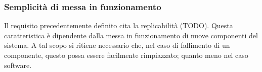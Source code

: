 \subsubsection{Semplicità di messa in funzionamento}
Il requisito precedentemente definito cita la replicabilità (TODO). Questa caratteristica è dipendente dalla messa in funzionamento di nuove componenti del sistema. A tal scopo si ritiene necessario che, nel caso di fallimento di un componente, questo possa essere facilmente rimpiazzato; quanto meno nel caso software.









